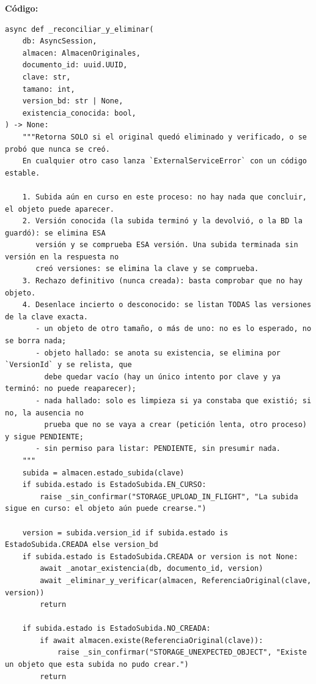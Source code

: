 \documentclass[11pt,a4paper]{article}
\begin{document}
\textbf{Código:}
\begin{lstlisting}
async def _reconciliar_y_eliminar(
    db: AsyncSession,
    almacen: AlmacenOriginales,
    documento_id: uuid.UUID,
    clave: str,
    tamano: int,
    version_bd: str | None,
    existencia_conocida: bool,
) -> None:
    """Retorna SOLO si el original quedó eliminado y verificado, o se probó que nunca se creó.
    En cualquier otro caso lanza `ExternalServiceError` con un código estable.

    1. Subida aún en curso en este proceso: no hay nada que concluir, el objeto puede aparecer.
    2. Versión conocida (la subida terminó y la devolvió, o la BD la guardó): se elimina ESA
       versión y se comprueba ESA versión. Una subida terminada sin versión en la respuesta no
       creó versiones: se elimina la clave y se comprueba.
    3. Rechazo definitivo (nunca creada): basta comprobar que no hay objeto.
    4. Desenlace incierto o desconocido: se listan TODAS las versiones de la clave exacta.
       - un objeto de otro tamaño, o más de uno: no es lo esperado, no se borra nada;
       - objeto hallado: se anota su existencia, se elimina por `VersionId` y se relista, que
         debe quedar vacío (hay un único intento por clave y ya terminó: no puede reaparecer);
       - nada hallado: solo es limpieza si ya constaba que existió; si no, la ausencia no
         prueba que no se vaya a crear (petición lenta, otro proceso) y sigue PENDIENTE;
       - sin permiso para listar: PENDIENTE, sin presumir nada.
    """
    subida = almacen.estado_subida(clave)
    if subida.estado is EstadoSubida.EN_CURSO:
        raise _sin_confirmar("STORAGE_UPLOAD_IN_FLIGHT", "La subida sigue en curso: el objeto aún puede crearse.")

    version = subida.version_id if subida.estado is EstadoSubida.CREADA else version_bd
    if subida.estado is EstadoSubida.CREADA or version is not None:
        await _anotar_existencia(db, documento_id, version)
        await _eliminar_y_verificar(almacen, ReferenciaOriginal(clave, version))
        return

    if subida.estado is EstadoSubida.NO_CREADA:
        if await almacen.existe(ReferenciaOriginal(clave)):
            raise _sin_confirmar("STORAGE_UNEXPECTED_OBJECT", "Existe un objeto que esta subida no pudo crear.")
        return


\end{lstlisting}
\end{document}

